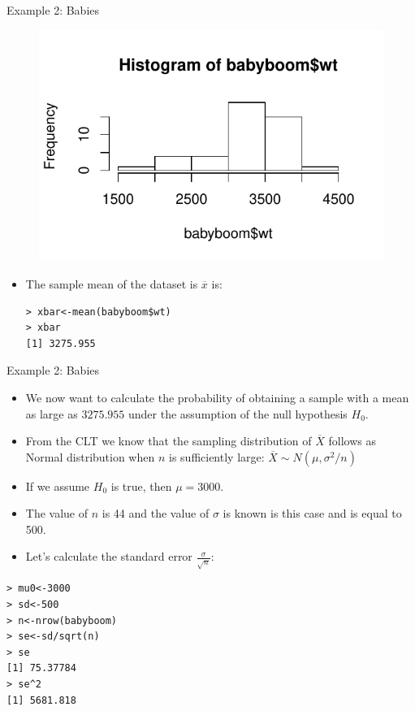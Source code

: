 \documentclass[handout]{beamer}
\begin{document}
\begin{frame}[fragile]{Example 2: Babies}
\scriptsize{

 \begin{figure}[h!]
	\centering
	\includegraphics[scale=0.6]{pics/babyhist.pdf}
\end{figure}

\begin{itemize}
 \item The sample mean of the dataset is $\overline{x}$ is: 
 \begin{verbatim}
> xbar<-mean(babyboom$wt)
> xbar
[1] 3275.955
 \end{verbatim}
 
\end{itemize}


} 
\end{frame}


\begin{frame}[fragile]{Example 2: Babies}
\scriptsize{

\begin{itemize}
 \item We now want to calculate the probability of obtaining a sample with a mean as large as $3275.955$ under the assumption of the null hypothesis $H_0$.
 \item From the CLT we know that the sampling distribution of $\overline{X}$ follows as Normal distribution when $n$ is sufficiently large: $\overline{X} \sim N(\mu, \sigma^2/n)$
 \item If we assume $H_0$ is true, then $\mu=3000$.
 \item The value of $n$ is 44 and the value of $\sigma$ is known is this case and is equal to 500. 
 \item Let's calculate the standard error $\frac{\sigma}{\sqrt{n}}$:
\end{itemize}

\begin{verbatim}
> mu0<-3000
> sd<-500
> n<-nrow(babyboom)
> se<-sd/sqrt(n)
> se
[1] 75.37784
> se^2
[1] 5681.818
\end{verbatim}



} 
\end{frame}
\end{document}
